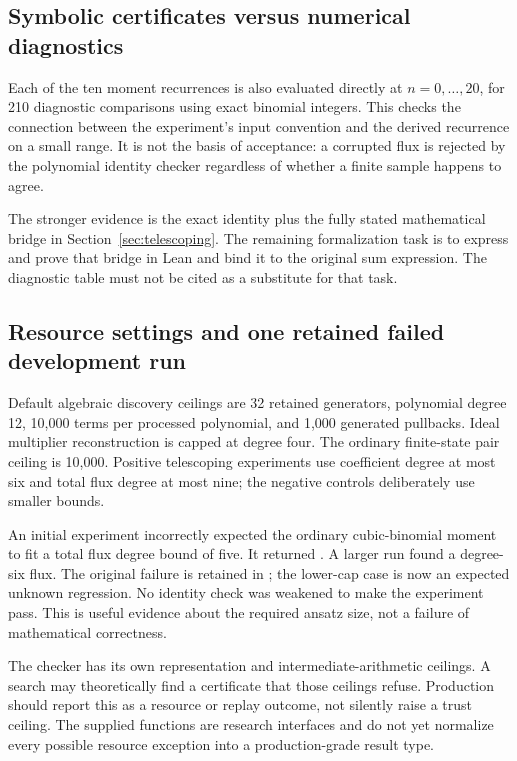 \subsection{Symbolic certificates versus numerical diagnostics}

Each of the ten moment recurrences is also evaluated directly at $n=0,\ldots,20$, for 210 diagnostic comparisons using exact binomial integers. This checks the connection between the experiment's input convention and the derived recurrence on a small range. It is not the basis of acceptance: a corrupted flux is rejected by the polynomial identity checker regardless of whether a finite sample happens to agree.

The stronger evidence is the exact identity plus the fully stated mathematical bridge in Section~\ref{sec:telescoping}. The remaining formalization task is to express and prove that bridge in Lean and bind it to the original sum expression. The diagnostic table must not be cited as a substitute for that task.

\subsection{Resource settings and one retained failed development run}

Default algebraic discovery ceilings are 32 retained generators, polynomial degree 12, 10,000 terms per processed polynomial, and 1,000 generated pullbacks. Ideal multiplier reconstruction is capped at degree four. The ordinary finite-state pair ceiling is 10,000. Positive telescoping experiments use coefficient degree at most six and total flux degree at most nine; the negative controls deliberately use smaller bounds.

An initial experiment incorrectly expected the ordinary cubic-binomial moment to fit a total flux degree bound of five. It returned \unknown{}. A larger run found a degree-six flux. The original failure is retained in ; the lower-cap case is now an expected unknown regression. No identity check was weakened to make the experiment pass. This is useful evidence about the required ansatz size, not a failure of mathematical correctness.

The checker has its own representation and intermediate-arithmetic ceilings. A search may theoretically find a certificate that those ceilings refuse. Production should report this as a resource or replay outcome, not silently raise a trust ceiling. The supplied functions are research interfaces and do not yet normalize every possible resource exception into a production-grade result type.

